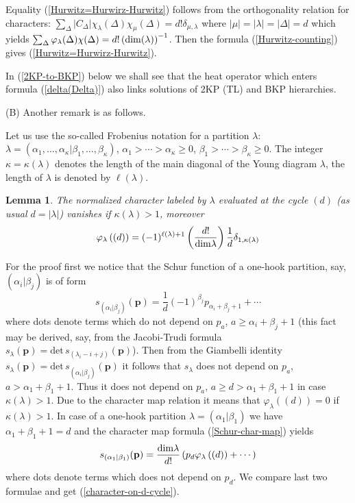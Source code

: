 \documentclass[a4paper,10pt]{article}
\newcommand{\bpow}{\mathbf{p}}
\theoremstyle{plain}
\newtheorem{Lemma}{Lemma}
\theoremstyle{remark}
\def\det{\mathrm {det}}
\def\bl{\begin{Lemma}}
\def\el{\end{Lemma}}
\def\be{\begin{equation}}
\def\ee{\end{equation}}
\def\det{\mathrm {det}}
\begin{document}
Equality (\ref{Hurwitz=Hurwirz-Hurwitz}) follows from the orthogonality relation for characters:
$\sum_\Delta |C_\Delta| \chi_\lambda(\Delta)\chi_\mu(\Delta) = d!\delta_{\mu,\lambda}$ where $|\mu|=|\lambda|=|\Delta|=d$
which yields $\sum_\Delta \varphi_\lambda(\Delta)\chi(\Delta)=d!\left({\rm dim}(\lambda)\right)^{-1} $.  Then the formula
(\ref{Hurwitz-counting})  gives (\ref{Hurwitz=Hurwirz-Hurwitz}).

In (\ref{2KP-to-BKP}) below we shall see that the heat operator which enters formula (\ref{delta(Delta)}) also links solutions of 2KP (TL)
and BKP hierarchies.


(B) Another remark is as follows.


Let us use the so-called Frobenius notation \cite{Mac} for a partition $\lambda$: $\lambda=(\alpha_1,\dots,\alpha_{\kappa}|\beta_1,\dots,\beta_\kappa)$,
$\alpha_1>\cdots >\alpha_\kappa\ge 0$, $\beta_1> \cdots >\beta_\kappa \ge 0$. The integer $\kappa=\kappa(\lambda)$ denotes the length
of the main diagonal of the Young diagram $\lambda$, the length of $\lambda$ is denoted by $\ell(\lambda)$.

\bl\label{character-on-d-cycle-lemma}
The normalized character labeled by $\lambda$ evaluated at the cycle $(d)$ (as usual $d=|\lambda|$) vanishes if $\kappa(\lambda)>1$, moreover
\be\label{character-on-d-cycle}
\varphi_\lambda\left((d)\right) = (-1)^{\ell(\lambda)+1}\left( \frac{d!}{{\rm dim}\lambda}  \right)\frac 1d \delta_{1,\kappa(\lambda)}
\ee
\el
For the proof first we notice that the Schur function of a one-hook partition, say, $(\alpha_i|\beta_j)$ is of form
\[
 s_{(\alpha_i|\beta_j)}(\bpow) = \frac 1d (-1)^{\beta_j}p_{\alpha_i+\beta_j+1} + \cdots
\]
where dots denote terms which do not depend on $p_a$, $a\ge \alpha_i+\beta_j+1$ (this fact may be derived, say, from the Jacobi-Trudi
formula $s_\lambda(\bpow)=\det\, s_{(\lambda_i-i+j)}(\bpow)$). Then from the Giambelli identity
$s_\lambda(\bpow)=\det\,s_{(\alpha_i|\beta_j)}(\bpow)$ it follows that $s_\lambda$ does not depend on $p_a$, $a>\alpha_1+\beta_1+1$. Thus
it does not depend on $p_a$, $a\ge d>\alpha_1+\beta_1 +1$ in case $\kappa(\lambda)>1$. Due to the character map relation it means that
$\varphi_\lambda\left((d)\right)=0$ if $\kappa(\lambda)>1$. In case of a one-hook partition $\lambda=(\alpha_1|\beta_1)$ we have
$\alpha_1+\beta_1+1 =d$ and the character
map formula (\ref{Schur-char-map}) yields
\[
 s_{(\alpha_1|\beta_1)}(\bpow)=\frac{{\rm dim}\lambda}{d!}\left(p_d\varphi_\lambda\left((d)\right) +\cdots \right)
\]
where dots denote terms which does not depend on $p_d$. We compare last two formulae and get (\ref{character-on-d-cycle}).
\end{document}
